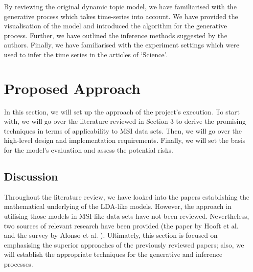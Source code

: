 \documentclass{mprop}
\begin{document}
\par By reviewing the original dynamic topic model, we have familiarised with the generative process which takes time-series into account. We have provided the visualisation of the model and introduced the algorithm for the generative process. Further, we have outlined the inference methods suggested by the authors. Finally, we have familiarised with the experiment settings which were used to infer the time series in the articles of `Science'. 

\section{Proposed Approach}

\par In this section, we will set up the approach of the project's execution. To start with, we will go over the literature reviewed in Section 3 to derive the promising techniques in terms of applicability to MSI data sets. Then, we will go over the high-level design and implementation requirements. Finally, we will set the basis for the model's evaluation and assess the potential risks. 


\subsection{Discussion}

\par Throughout the literature review, we have looked into the papers establishing the mathematical underlying of the LDA-like models. However, the approach in utilising those models in MSI-like data sets have not been reviewed. Nevertheless, two sources of relevant research have been provided (the paper by Hooft et al. \cite{hooft} and the survey by Alonso et al. \cite{alonso-et-al}). Ultimately, this section is focused on emphasising the superior approaches of the previously reviewed papers; also, we will establish the appropriate techniques for the generative and inference processes.
\end{document}
